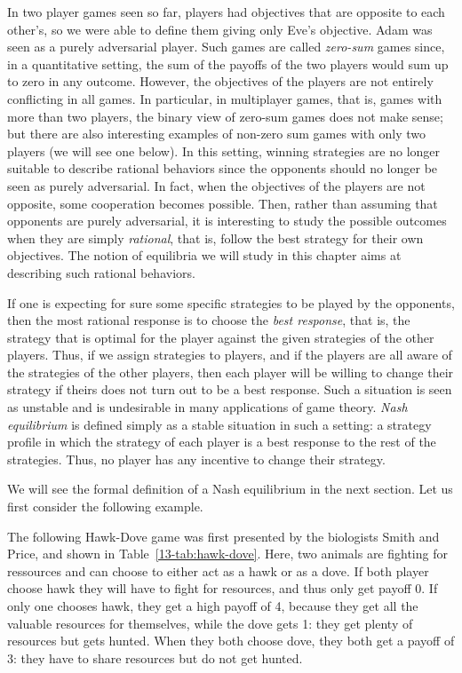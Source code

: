 

In two player games seen so far, players had objectives that are
opposite to each other's, so we were able to define them giving only
Eve's objective. Adam was seen as a purely adversarial player. Such games
are called \emph{zero-sum} games since, in a quantitative setting, the
sum of the payoffs of the two players would sum up to zero in any
outcome. However, the objectives of the players are not entirely
conflicting in all games.
In particular, in multiplayer games, that is,
games with more than two players, the binary view of zero-sum games
does not make sense;
but there are also interesting examples of non-zero sum games with only two
players (we will see one below). In this setting, winning strategies are
no longer suitable to describe rational behaviors since the opponents
should no longer be seen as purely adversarial. In fact, when the
objectives of the players are not opposite, some cooperation becomes
possible. Then, rather than assuming that opponents are purely
adversarial, it is interesting to study the possible outcomes when they
are simply \emph{rational}, that is, follow the best strategy for their
own objectives. The notion of equilibria we will study in this chapter
aims at describing such rational behaviors.

If one is expecting for sure some specific strategies to be played by the
opponents, then the most rational response is to choose the
\emph{best response}, that is, the strategy that is optimal for the
player against the given strategies of the other players. Thus, if we
assign strategies to players, and if the players are all aware of the
strategies of the other players, then each player will be willing to
change their strategy if theirs does not turn out to be a best response.
Such a situation is seen as unstable and is undesirable in many
applications of game theory. \emph{Nash equilibrium} is defined simply
as a stable situation in such a setting: a strategy profile in which the
strategy of each player is a best response to the rest of the
strategies. Thus, no player has any incentive to change their strategy.

We will see the formal definition of a Nash equilibrium in the next
section. Let us first consider the following example.

The following Hawk-Dove game was first presented by the biologists Smith
and Price, and shown in Table~\ref{13-tab:hawk-dove}.
Here, two animals are fighting for ressources and can choose to
either act as a hawk or as a dove.
If both player choose hawk they will have to fight for resources, and
thus only get payoff 0. If only one chooses hawk, they get a high payoff of
4, because they get all the valuable resources for themselves, while the dove
gets 1: they get plenty of resources but gets hunted. When they both choose
dove, they both get a payoff of 3: they have to share resources but do not get
hunted.

